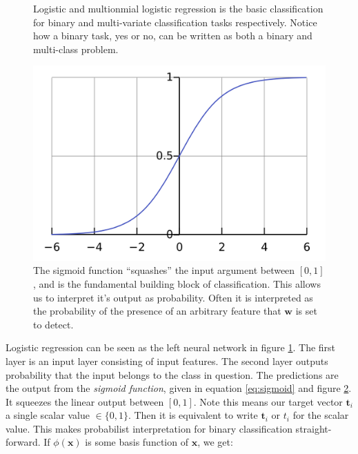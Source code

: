 \documentclass[11pt]{article}
\begin{document}
\begin{minipage}{0.52\textwidth}
  \begin{figure}[H]
    
    \caption{Logistic and multionmial logistic regression is the basic classification for binary and multi-variate classification tasks respectively. Notice how a binary task, yes or no, can be written as both a binary and multi-class problem.}
    \label{fig:logit_nn}
  \end{figure}
\end{minipage}\hfill
\begin{minipage}{0.42\textwidth}
  \begin{figure}[H]
    \includegraphics[width=\linewidth]{sigmoid}
    \caption{The sigmoid function ``squashes'' the input argument between $[0,1]$, and is the fundamental building block of classification. This allows us to interpret it's output as probability. Often it is interpreted as the probability of the presence of an arbitrary feature that $\mathbf{w}$ is set to detect.}
    \label{fig:sigmoid}
  \end{figure}
\end{minipage}
\vspace{0.25cm}

Logistic regression can be seen as the left neural network in figure \ref{fig:logit_nn}. The first layer is an input layer consisting of input features. The second layer outputs probability that the input belongs to the class in question. The predictions are the output from the \emph{sigmoid function}, given in equation \ref{eq:sigmoid} and figure \ref{fig:sigmoid}. It squeezes the linear output between $[0,1]$. Note this means our target vector $\mathbf{t}_{i}$ a single scalar value $\in\{0,1\}$. Then it is equivalent to write $\mathbf{t}_{i}$ or $t_{i}$ for the scalar value. This makes probabilist interpretation for binary classification straight-forward. If $\phi(\mathbf{x})$ is some basis function of $\mathbf{x}$, we get: 
\end{document}

